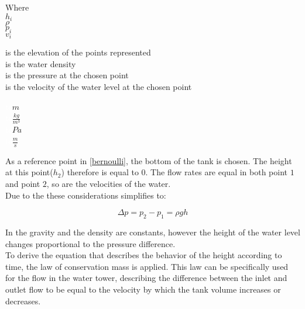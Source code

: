 \begin{minipage}[t]{0.20\textwidth}
Where\\
\hspace*{8mm} $h_i$ \\
\hspace*{8mm} $\rho$ \\
\hspace*{8mm} $p_i$ \\
\hspace*{8mm} $v_i$ \\

\end{minipage}
\begin{minipage}[t]{0.68\textwidth}
\vspace*{2mm}
is the elevation of the points represented\\
is the water density\\
is the pressure at the chosen point\\
is the velocity of the water level at the chosen point
\end{minipage}
\begin{minipage}[t]{0.10\textwidth}
\vspace*{2mm}
\textcolor{White}{te}$\unit{m}$\\
\textcolor{White}{te}$\unit{\frac{kg}{m^3}}$\\
\textcolor{White}{te}$\unit{Pa}$\\
\textcolor{White}{te}$\unit{\frac{m}{s}}$
\end{minipage}


As a reference point in \eqref{bernoulli}, the bottom of the tank is chosen. The height at this point($h_2$) therefore is equal to 0. The flow rates are equal in both point $1$ 
and point $2$, so are the velocities of the water. \\
Due to the these considerations  simplifies to: 

\begin{equation}
  \Delta p = p_2 - p_1 = \rho g h
  \label{Pressuredifference}
\end{equation}

In  the gravity and the density are constants, however the height of the water level changes proportional to the pressure difference. 
\\
To derive the equation that describes the behavior of the height according to 
time, the law of conservation mass is applied. This law can be specifically used for the flow in the water tower, describing the difference between the inlet and outlet flow to be equal to the velocity by which the tank volume increases or decreases. 

